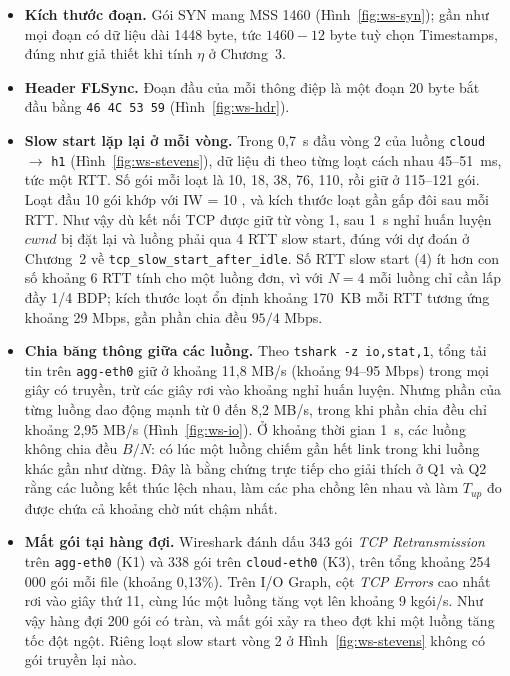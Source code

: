 \begin{itemize}
    \item \textbf{Kích thước đoạn.} Gói SYN mang MSS 1460 (Hình~\ref{fig:ws-syn}); gần như mọi đoạn có dữ liệu dài 1448 byte, tức $1460 - 12$ byte tuỳ chọn Timestamps, đúng như giả thiết khi tính $\eta$ ở Chương~3.
    \item \textbf{Header FLSync.} Đoạn đầu của mỗi thông điệp là một đoạn 20 byte bắt đầu bằng \texttt{46 4C 53 59} (Hình~\ref{fig:ws-hdr}).
    \item \textbf{Slow start lặp lại ở mỗi vòng.} Trong 0{,}7~s đầu vòng 2 của luồng \texttt{cloud} $\rightarrow$ \texttt{h1} (Hình~\ref{fig:ws-stevens}), dữ liệu đi theo từng loạt cách nhau 45--51~ms, tức một RTT. Số gói mỗi loạt là 10, 18, 38, 76, 110, rồi giữ ở 115--121 gói. Loạt đầu 10 gói khớp với IW = 10 \cite{rfc6928}, và kích thước loạt gần gấp đôi sau mỗi RTT. Như vậy dù kết nối TCP được giữ từ vòng 1, sau 1~s nghỉ huấn luyện $cwnd$ bị đặt lại và luồng phải qua 4 RTT slow start, đúng với dự đoán ở Chương~2 về \nolinkurl{tcp_slow_start_after_idle}. Số RTT slow start (4) ít hơn con số khoảng 6 RTT tính cho một luồng đơn, vì với $N = 4$ mỗi luồng chỉ cần lấp đầy 1/4 BDP; kích thước loạt ổn định khoảng 170~KB mỗi RTT tương ứng khoảng 29 Mbps, gần phần chia đều $95/4$ Mbps.
    \item \textbf{Chia băng thông giữa các luồng.} Theo \texttt{tshark -z io,stat,1}, tổng tải tin trên \texttt{agg-eth0} giữ ở khoảng 11{,}8 MB/s (khoảng 94--95 Mbps) trong mọi giây có truyền, trừ các giây rơi vào khoảng nghỉ huấn luyện. Nhưng phần của từng luồng dao động mạnh từ 0 đến 8{,}2 MB/s, trong khi phần chia đều chỉ khoảng 2{,}95 MB/s (Hình~\ref{fig:ws-io}). Ở khoảng thời gian 1~s, các luồng không chia đều $B/N$: có lúc một luồng chiếm gần hết link trong khi luồng khác gần như dừng. Đây là bằng chứng trực tiếp cho giải thích ở Q1 và Q2 rằng các luồng kết thúc lệch nhau, làm các pha chồng lên nhau và làm $T_{up}$ đo được chứa cả khoảng chờ nút chậm nhất.
    \item \textbf{Mất gói tại hàng đợi.} Wireshark đánh dấu 343 gói \emph{TCP Retransmission} trên \texttt{agg-eth0} (K1) và 338 gói trên \texttt{cloud-eth0} (K3), trên tổng khoảng 254\,000 gói mỗi file (khoảng 0{,}13\%). Trên I/O Graph, cột \emph{TCP Errors} cao nhất rơi vào giây thứ 11, cùng lúc một luồng tăng vọt lên khoảng 9 kgói/s. Như vậy hàng đợi 200 gói có tràn, và mất gói xảy ra theo đợt khi một luồng tăng tốc đột ngột. Riêng loạt slow start vòng 2 ở Hình~\ref{fig:ws-stevens} không có gói truyền lại nào.
\end{itemize}

